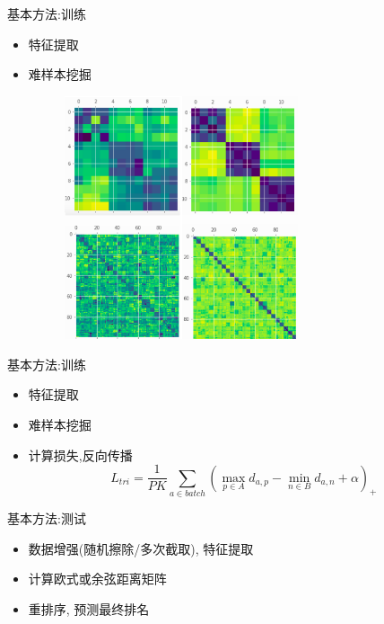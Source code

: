 \documentclass[notes]{beamer}
\begin{document}
\begin{frame}
	{基本方法:训练} 
	\begin{itemize}
		\item 特征提取
		\item 难样本挖掘
		\begin{figure}
			\centering
			\includegraphics[width=0.65\textwidth]{2018-03-12-14-59-27.png}
		\end{figure}
	\end{itemize}
\end{frame}

\begin{frame}
	{基本方法:训练} 
	\begin{itemize}
		\item 特征提取
		\item 难样本挖掘
		\item 计算损失,反向传播
		\begin{equation} 
			L_{tri}=\frac{1}{PK}\sum_{a \in batch} \left( \max_{p \in A} d_{a,p} -  \min_{n \in B} d_{a,n} +\alpha \right)_+
		\end{equation}
	\end{itemize}
\end{frame}

\begin{frame}
	{基本方法:测试} 
	\begin{itemize}
		\item 数据增强(随机擦除/多次截取), 特征提取
		\item 计算欧式或余弦距离矩阵
		\item 重排序\cite{zhong2017reranking}, 预测最终排名
	\end{itemize}
\end{frame}
\end{document}
